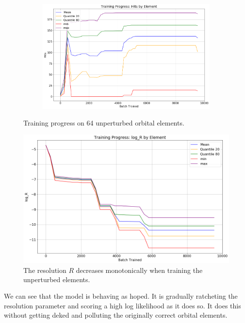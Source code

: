 \begin{figure}[h]
\begin{subfigure}[t]{\subfigwidth\textwidth}
\end{subfigure}
\hfill
\begin{subfigure}[t]{\subfigwidth\textwidth}
\centering
\includegraphics[width=\linewidth]{../figs/search_known/unperturbed/learning_curve_hits.png}
\end{subfigure}
\caption{Training progress on 64 unperturbed orbital elements.}
\end{figure}

\begin{figure}[hbt!]
\begin{center}
\includegraphics[width=1.0\textwidth]{../figs/search_known/unperturbed/learning_curve_log_R.png}
\caption{The resolution $R$ decreases monotonically when training the unperturbed elements.}
\end{center}
\end{figure}

We can see that the model is behaving as hoped.
It is gradually ratcheting the resolution parameter and scoring a high log likelihood as it does so.
It does this without getting deked and polluting the originally correct orbital elements.

